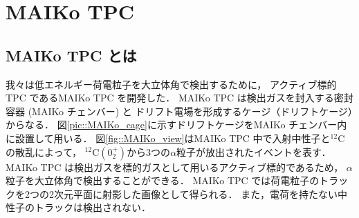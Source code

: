 \documentclass[../master]{subfiles}
\begin{document}
\chapter{MAIKo TPC}
\section{MAIKo TPC とは}
我々は低エネルギー荷電粒子を大立体角で検出するために，
アクティブ標的TPC であるMAIKo TPC を開発した．
MAIKo TPC は検出ガスを封入する密封容器 (MAIKo チェンバー) と
ドリフト電場を形成するケージ（ドリフトケージ）からなる．
図\ref{pic::MAIKo_cage}に示すドリフトケージをMAIKo チェンバー内に設置して用いる．
図\ref{fig::MAIKo_view}はMAIKo TPC 中で入射中性子と${}^{12}\mathrm{C}$の散乱によって，
${}^{12}\mathrm{C} (0_2^+)$から3つの$\alpha$粒子が放出されたイベントを表す．
MAIKo TPC は検出ガスを標的ガスとして用いるアクティブ標的であるため，
$\alpha$粒子を大立体角で検出することができる．
MAIKo TPC では荷電粒子のトラックを2つの2次元平面に射影した画像として得られる．
また，電荷を持たない中性子のトラックは検出されない．
\end{document}
